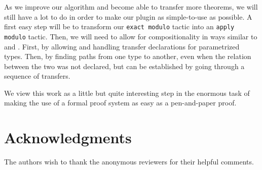 \documentclass{llncs}
\begin{document}
As we improve our algorithm and become able to transfer more theorems,
we will still have a lot to do in order to make our plugin as simple-to-use
as possible.
A first easy step will be to transform our \texttt{exact modulo} tactic
into an \texttt{apply modulo} tactic.
Then, we will need to allow for compositionality
in ways similar to \cite{Cohen2013} and \cite{huffman2013lifting}.
First, by allowing
and handling transfer declarations for parametrized types. Then,
by finding paths from one type to another, even when the relation
between the two was not declared, but can be established by going through
a sequence of transfers.

We view this work as a little but quite interesting step in the enormous task
of making the use of a formal proof system as easy as a
pen-and-paper proof.

\section*{Acknowledgments}

The authors wish to thank the anonymous reviewers for their helpful comments.



\end{document}
